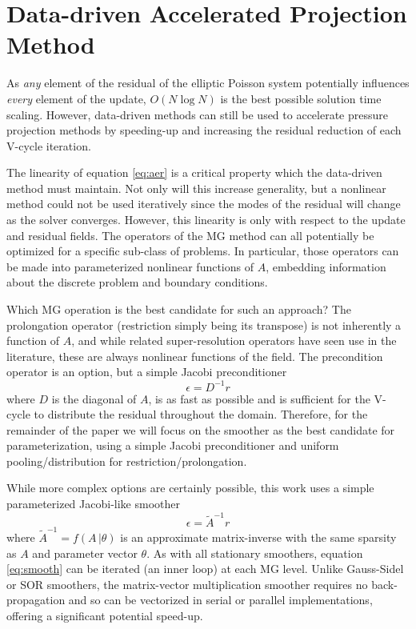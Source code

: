 \documentclass[review]{elsarticle}
\begin{document}
\section{Data-driven Accelerated Projection Method}

As \textit{any} element of the residual of the elliptic Poisson system potentially influences \textit{every} element of the update, $O(N\log N)$ is the best possible solution time scaling. However, data-driven methods can still be used to accelerate pressure projection methods by speeding-up and increasing the residual reduction of each V-cycle iteration.

The linearity of equation \ref{eq:aer} is a critical property which the data-driven method must maintain. Not only will this increase generality, but a nonlinear method could not be used iteratively since the modes of the residual will change as the solver converges. However, this linearity is only with respect to the update and residual fields. The operators of the MG method can all potentially be optimized for a specific sub-class of problems. In particular, those operators can be made into parameterized nonlinear functions of $A$, embedding information about the discrete problem and boundary conditions. 

Which MG operation is the best candidate for such an approach? The prolongation operator (restriction simply being its transpose) is not inherently a function of $A$, and while related super-resolution operators have seen use in the literature, these are always nonlinear functions of the field. The precondition operator is an option, but a simple Jacobi preconditioner
\begin{equation}
    \epsilon = D^{-1}r
\end{equation}
where $D$ is the diagonal of $A$, is as fast as possible and is sufficient for the V-cycle to distribute the residual throughout the domain. Therefore, for the remainder of the paper we will focus on the smoother as the best candidate for parameterization, using a simple Jacobi preconditioner and uniform pooling/distribution for restriction/prolongation.

While more complex options are certainly possible, this work uses a simple parameterized Jacobi-like smoother
\begin{equation}\label{eq:smooth}
    \epsilon = \tilde A^{-1}r
\end{equation}
where $\tilde A^{-1}=f(A\,|\theta)$ is an approximate matrix-inverse with the same sparsity as $A$ and parameter vector $\theta$. 
As with all stationary smoothers, equation \ref{eq:smooth} can be iterated (an inner loop) at each MG level. Unlike Gauss-Sidel or SOR smoothers, the matrix-vector multiplication smoother requires no back-propagation and so can be vectorized in serial or parallel implementations, offering a significant potential speed-up. 
\end{document}
